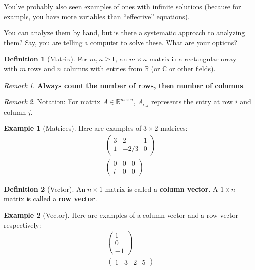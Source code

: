 \documentclass[12pt, a4paper]{article}
\newcommand{\R}{\mathbb{R}}
\theoremstyle{remark}
\newtheorem{remark}{Remark}
\theoremstyle{definition}
\newtheorem{definition}{Definition}
\newtheorem{example}{Example}
\numberwithin{equation}{section}
\numberwithin{definition}{section}
\numberwithin{example}{section}
\numberwithin{exercise}{section}
\numberwithin{remark}{section}
\numberwithin{figure}{section}
\begin{document}
You've probably also seen examples of ones with infinite solutions (because for example, you have more variables than ``effective'' equations).

You can analyze them by hand, but is there a systematic approach to analyzing them?
Say, you are telling a computer to solve these. What are your options?

\begin{definition}[Matrix]
    For $m,n \geq 1$, an \underline{$m \times n$ matrix} is a rectangular array with $m$ rows and $n$ columns with entries from $\R$ (or $\mathbb{C}$ or other fields).
\end{definition}
\begin{remark}
    \textbf{Always count the number of rows, then number of columns}.
\end{remark}
\begin{remark}
    Notation: For matrix $A \in \R^{m \times n}$, $A_{i,j}$ represents the entry at row $i$ and column $j$.
\end{remark}
\begin{example}[Matrices]
    Here are examples of $3 \times 2$ matrices:
    \begin{align*}
        &
        \begin{pmatrix}
            3 & 2 & 1 \\
            1 & -2/3 & 0
        \end{pmatrix} \\
        &
        \begin{pmatrix}
            0 & 0 & 0 \\
            i & 0 & 0
        \end{pmatrix}
    \end{align*}
\end{example}
\begin{definition}[Vector]
    An $n \times 1$ matrix is called a \textbf{column vector}.
    A $1 \times n$ matrix is called a \textbf{row vector}.
\end{definition}
\begin{example}[Vector]
    Here are examples of a column vector and a row vector respectively:
    \begin{align*}
        &
    \begin{pmatrix}
        1 \\
        0 \\
        -1
    \end{pmatrix}
    \\
    &
    \begin{pmatrix}
        1 & 3 & 2 & 5
    \end{pmatrix}
    \end{align*}
\end{example}
\end{document}
